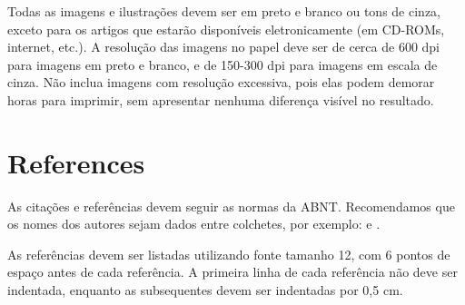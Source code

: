 \documentclass[12pt]{article}
\begin{document}
Todas as imagens e ilustrações devem ser em preto e branco ou tons de cinza, exceto para os artigos que estarão disponíveis eletronicamente (em CD-ROMs, internet, etc.). A resolução das imagens no papel deve ser de cerca de 600 dpi para imagens em preto e branco, e de 150-300 dpi para imagens em escala de cinza. Não inclua imagens com resolução excessiva, pois elas podem demorar horas para imprimir, sem apresentar nenhuma diferença visível no resultado.

\section{References}

As citações e referências devem seguir as normas da ABNT. Recomendamos que os nomes dos autores sejam dados entre colchetes, por exemplo: \cite{kolevaPropertiesMixedReality1999} e \cite{toriIntroducaoRealidadeVirtual2020}.

As referências devem ser listadas utilizando fonte tamanho 12, com 6 pontos de espaço antes de cada referência. A primeira linha de cada referência não deve ser indentada, enquanto as subsequentes devem ser indentadas por 0,5 cm.



\end{document}

